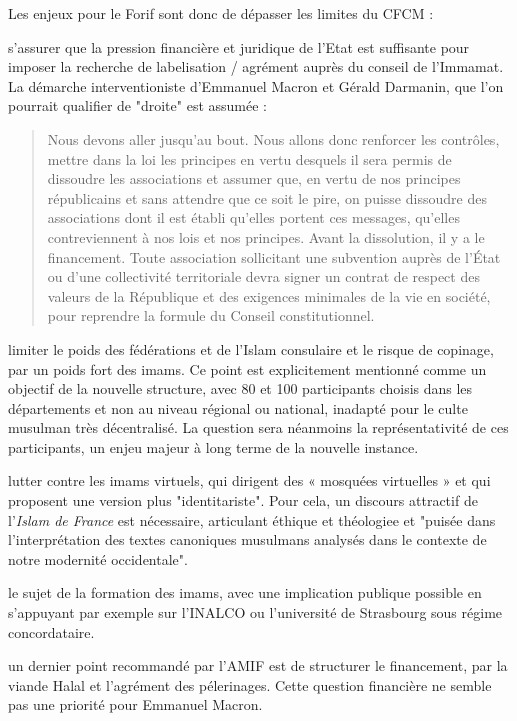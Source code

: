 Les enjeux pour le Forif sont donc de dépasser les limites du CFCM : 
\bi
\item s'assurer que la pression financière et juridique de l'Etat est suffisante pour imposer la recherche de labelisation / agrément auprès du conseil de l'Immamat. La démarche interventioniste d'Emmanuel Macron et Gérald Darmanin, que l'on pourrait qualifier de "droite"  est assumée  : \begin{quote}
    Nous devons aller jusqu'au bout. Nous allons donc renforcer les contrôles, mettre dans la loi les principes en vertu desquels il sera permis de dissoudre les associations et assumer que, en vertu de nos principes républicains et sans attendre que ce soit le pire, on puisse dissoudre des associations dont il est établi qu'elles portent ces messages, qu'elles contreviennent à nos lois et nos principes. Avant la
dissolution, il y a le financement. Toute association sollicitant une subvention auprès de l'État ou d'une collectivité territoriale devra signer un contrat de respect des valeurs de la République et des exigences minimales de la vie en société, pour reprendre la formule du Conseil constitutionnel.
\end{quote}
\item limiter le poids des fédérations et de l'Islam consulaire et le risque de copinage, par un poids fort des imams. Ce point est explicitement mentionné comme un objectif de la nouvelle structure, avec 80 et 100 participants choisis dans les départements et non au niveau régional ou national, inadapté pour le culte musulman très décentralisé. La question sera néanmoins la représentativité de ces participants, un enjeu majeur à long terme de la nouvelle instance.
\item lutter contre les imams virtuels, qui dirigent des  « mosquées virtuelles » et qui proposent une version plus "identitariste". Pour cela,  un discours attractif de l'\emph{Islam de France} est nécessaire, articulant éthique et théologiee et "puisée dans l’interprétation des textes canoniques musulmans analysés dans le contexte de notre modernité occidentale".
\item le sujet de la formation des imams, avec une implication publique possible en s'appuyant par exemple sur l'INALCO ou l'université de Strasbourg sous régime concordataire.
\item un dernier point recommandé par l'AMIF est de structurer le financement, par la viande Halal et l'agrément des pélerinages. Cette question financière ne semble pas une priorité pour Emmanuel Macron.

